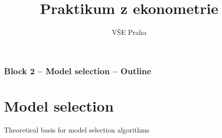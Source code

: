 \documentclass{beamer}
\title[Block 2]{Praktikum z ekonometrie} %
\author{VŠE Praha} %
\institute[4EK417] %
{
\medskip
\textit{Tomáš Formánek} %
}
\date{} %
\begin{document}
\begin{frame}
\titlepage %
\end{frame}

\begin{frame}
\frametitle{Block 2 -- Model selection -- Outline} %
\tableofcontents %
\end{frame}

\section{Model selection}
\begin{frame}{Theoretical basis for model selection algorithms}

\end{frame}
\end{document}
